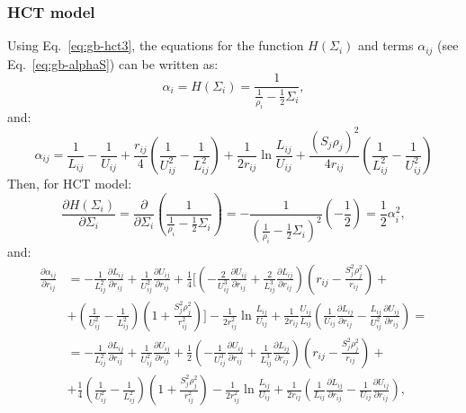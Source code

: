 \documentclass[11pt]{book}
\begin{document}

\subsubsection{HCT model}

Using Eq.~\ref{eq:gb-hct3}, the equations for the function $H(\Sigma_{i})$ and terms $\alpha_{ij}$ (see Eq.~\ref{eq:gb-alphaS}) can be written as:
\begin{equation}\label{eq:gb-hctf-1}
\alpha_{i}=H(\Sigma_{i})=\frac{1}{\frac{1}{\rho_{i}}-\frac{1}{2}\Sigma_{i}},
\end{equation}
and:
\begin{equation}\label{eq:gb-hctf-2}
\alpha_{ij}=\frac{1}{L_{ij}}-\frac{1}{U_{ij}}+\frac{r_{ij}}{4}\left(\frac{1}{U_{ij}^{2}}-\frac{1}{L_{ij}^{2}}\right)+\frac{1}{2r_{ij}}\ln\frac{L_{ij}}{U_{ij}}+\frac{(S_{j}\rho_{j})^{2}}{4r_{ij}}\left(\frac{1}{L_{ij}^{2}}-\frac{1}{U_{ij}^{2}}\right)
\end{equation}
Then, for HCT model:
\begin{equation}\label{eq:gb-hctf-3}
\frac{\partial H(\Sigma_{i})}{\partial \Sigma_{i}}=\frac{\partial}{\partial\Sigma_{i}}\left(\frac{1}{\frac{1}{\rho_{i}}-\frac{1}{2}\Sigma_{i}}\right)=-\frac{1}{\left(\frac{1}{\rho_{i}}-\frac{1}{2}\Sigma_{i}\right)^{2}}\left(-\frac{1}{2}\right)=\frac{1}{2}\alpha_{i}^{2},
\end{equation}
and:
\begin{equation}\label{eq:gb-hctf-4}
\begin{split}
\frac{\partial\alpha_{ij}}{\partial r_{ij}}&=-\frac{1}{L_{ij}^{2}}\frac{\partial L_{ij}}{\partial r_{ij}}+\frac{1}{U_{ij}^{2}}\frac{\partial U_{ij}}{\partial r_{ij}}+\frac{1}{4}\Bigg[\left(-\frac{2}{U_{ij}^{3}}\frac{\partial U_{ij}}{\partial r_{ij}}+\frac{2}{L_{ij}^{3}}\frac{\partial L_{ij}}{\partial r_{ij}}\right)\left(r_{ij}-\frac{S_{j}^{2}\rho_{j}^{2}}{r_{ij}}\right)+\\
&+\left(\frac{1}{U_{ij}^{2}}-\frac{1}{L_{ij}^{2}}\right)\left(1+\frac{S_{j}^{2}\rho_{j}^{2}}{r_{ij}^{2}}\right)\Bigg]-\frac{1}{2r_{ij}^{2}}\ln{\frac{L_{ij}}{U_{ij}}}+\frac{1}{2r_{ij}}\frac{U_{ij}}{L_{ij}}\left(\frac{1}{U_{ij}}\frac{\partial L_{ij}}{\partial r_{ij}}-\frac{L_{ij}}{U_{ij}^{2}}\frac{\partial U_{ij}}{\partial r_{ij}}\right)=\\
&=-\frac{1}{L_{ij}^{2}}\frac{\partial L_{ij}}{\partial r_{ij}}+\frac{1}{U_{ij}^{2}}\frac{\partial U_{ij}}{\partial r_{ij}}+\frac{1}{2}\left(-\frac{1}{U_{ij}^{3}}\frac{\partial U_{ij}}{\partial r_{ij}}+\frac{1}{L_{ij}^{3}}\frac{\partial L_{ij}}{\partial r_{ij}}\right)\left(r_{ij}-\frac{S_{j}^{2}\rho_{j}^{2}}{r_{ij}}\right)+\\
&+\frac{1}{4}\left(\frac{1}{U_{ij}^{2}}-\frac{1}{L_{ij}^{2}}\right)\left(1+\frac{S_{j}^{2}\rho_{j}^{2}}{r_{ij}^{2}}\right)-\frac{1}{2r_{ij}^{2}}\ln{\frac{L_{ij}}{U_{ij}}}+\frac{1}{2r_{ij}}\left(\frac{1}{L_{ij}}\frac{\partial L_{ij}}{\partial r_{ij}}-\frac{1}{U_{ij}}\frac{\partial U_{ij}}{\partial r_{ij}}\right),
\end{split}
\end{equation}
\end{document}
